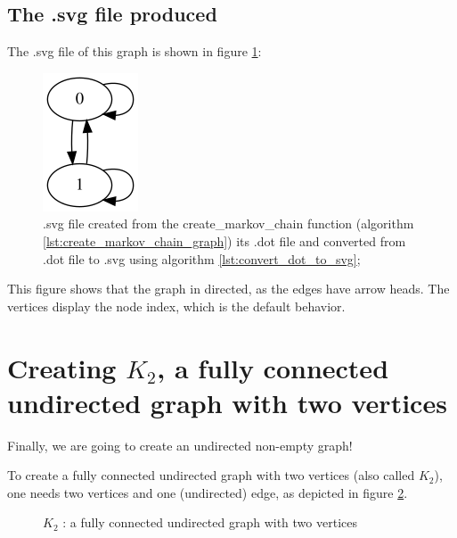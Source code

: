 \subsection{The .svg file produced}
\label{subsec:create_markov_chain.svg}

The .svg file of this graph is shown in figure \ref{fig:create_markov_chain.svg}:

\begin{figure}[!htbp]
  \includegraphics[]{create_markov_chain.png}
  \caption{
    .svg file created from the create\_markov\_chain function 
    (algorithm \ref{lst:create_markov_chain_graph}) 
    its .dot file and converted from .dot file to .svg using algorithm 
    \ref{lst:convert_dot_to_svg};
  }
  \label{fig:create_markov_chain.svg}
\end{figure}

This figure shows that the graph in directed, as the edges have arrow heads.
The vertices display the node index, which is the default behavior.

\section{Creating $K_{2}$, a fully connected undirected graph with two vertices}
\label{subsec:create_k2_graph}

Finally, we are going to create an undirected non-empty graph!

To create a fully connected undirected graph with two vertices (also called
$K_{2}$), 
one needs two vertices and one (undirected) edge, 
as depicted in figure \ref{fig:k2_graph}.


\begin{figure}
  \caption{$K_{2}$ : a fully connected undirected graph with two vertices}
  \label{fig:k2_graph}
\end{figure}

